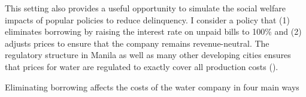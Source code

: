 \documentclass[12pt]{article}
\begin{document}

This setting also provides a useful opportunity to simulate the social welfare impacts of popular policies to reduce delinquency.  I consider a policy that (1) eliminates borrowing by raising the interest rate on unpaid bills to 100\% and (2) adjusts prices to ensure that the company remains revenue-neutral.  The regulatory structure in Manila as well as many other developing cities ensures that prices for water are regulated to exactly cover all production costs (\cite{hoque2013state}).

Eliminating borrowing affects the costs of the water company in four main ways
\end{document}
